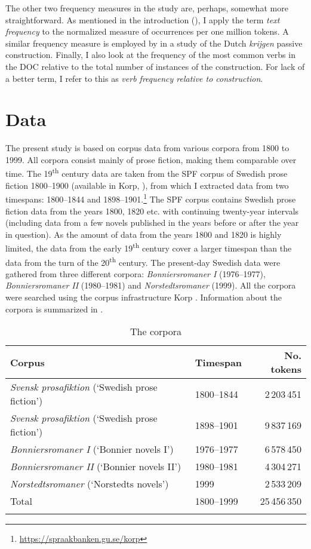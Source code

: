 \documentclass[output=paper]{langscibook}
\begin{document}
The other two frequency measures in the study are, perhaps, somewhat more straightforward. As mentioned in the introduction (), I apply the term \textit{text frequency} to the normalized measure of occurrences per one million tokens. A similar frequency measure is employed by \citet{Colleman2015} in a study of the Dutch \textit{krijgen} passive construction. Finally, I also look at the frequency of the most common verbs in the DOC relative to the total number of instances of the construction. For lack of a better term, I refer to this as \textit{verb frequency relative to construction}.


\section{Data}\label{sec:valdeson:4}


The present study is based on corpus data from various corpora from 1800 to 1999. All corpora consist mainly of prose fiction, making them comparable over time. The 19\textsuperscript{th} century data are taken from the SPF corpus of Swedish prose fiction 1800–1900 (available in Korp, \citealt{BorinEtAl2012}), from which I extracted data from two timespans: 1800–1844 and 1898–1901.\footnote{\url{https://spraakbanken.gu.se/korp}}  The SPF corpus contains Swedish prose fiction data from the years 1800, 1820 etc. with continuing twenty-year intervals (including data from a few novels published in the years before or after the year in question). As the amount of data from the years 1800 and 1820 is highly limited, the data from the early 19\textsuperscript{th} century cover a larger timespan than the data from the turn of the 20\textsuperscript{th} century. The present-day Swedish data were gathered from three different corpora: \textit{Bonniersromaner I} (1976–1977), \textit{Bonniersromaner II} (1980–1981) and \textit{Norstedtsromaner} (1999). All the corpora were searched using the corpus infrastructure Korp \citep{BorinEtAl2012}. Information about the corpora is summarized in .


\begin{table}
\caption{The corpora\label{tab:valdeson:2}}
\begin{tabular}{llr}
\lsptoprule
Corpus & Timespan & No. tokens\\
\midrule
\textit{Svensk prosafiktion} (‘Swedish prose fiction') & 1800–1844 & 2\,203\,451\\
\textit{Svensk prosafiktion} (‘Swedish prose fiction') & 1898–1901 & 9\,837\,169\\
\textit{Bonniersromaner I} (‘Bonnier novels I’) & 1976–1977 & 6\,578\,450\\
\textit{Bonniersromaner II}  (‘Bonnier novels II’) & 1980–1981 & 4\,304\,271\\
\textit{Norstedtsromaner}  (‘Norstedts novels’) & 1999 & 2\,533\,209\\
\midrule
Total & 1800–1999 & 25\,456\,350\\
\lspbottomrule
\end{tabular}
\end{table}
\end{document}
